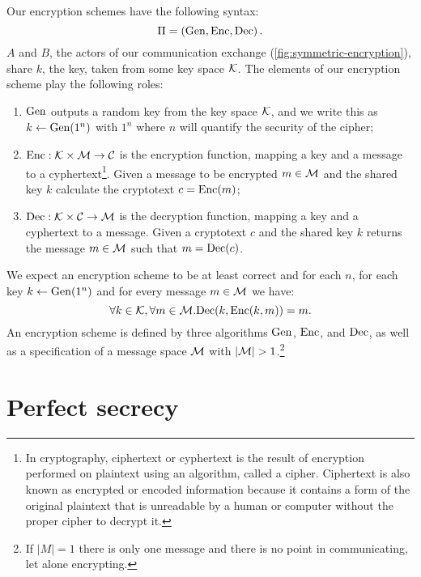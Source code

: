Our encryption schemes have the following syntax:
\begin{equation*}
	\Pi = \left( \mathrm{Gen}, \allowbreak \mathrm{Enc}, \allowbreak \mathrm{Dec} \right).
\end{equation*}
$A$ and $B$, the actors of our communication exchange (\cref{fig:symmetric-encryption}), share $k$, the key, taken from some key space $\mathcal{K}$.
The elements of our encryption scheme play the following roles:
\begin{enumerate}
	\item $\mathrm{Gen}$ outputs a random key from the key space $\mathcal{K}$, and we write this as $k \leftarrow \mathrm{Gen}(1^n)$ with $1^n$ where $n$ will quantify the security of the cipher;
	\item $\mathrm{Enc} : \mathcal{K} \times \mathcal{M} \to \mathcal{C}$ is the encryption function, mapping a key and a message to a cyphertext\footnote{In cryptography, ciphertext or cyphertext is the result of encryption performed on plaintext using an algorithm, called a cipher. Ciphertext is also known as encrypted or encoded information because it contains a form of the original plaintext that is unreadable by a human or computer without the proper cipher to decrypt it.}. Given a message to be encrypted $m \in \mathcal{M}$ and the shared key $k$ calculate the cryptotext $c = \mathrm{Enc}(m)$;
	\item $\mathrm{Dec} : \mathcal{K} \times \mathcal{C} \to \mathcal{M}$ is the decryption function, mapping a key and a cyphertext to a message. Given a cryptotext $c$ and the shared key $k$ returns the message $m \in \mathcal{M}$ such that $m = \mathrm{Dec}(c)$.
\end{enumerate}
We expect an encryption scheme to be at least correct and for each $n$, for each key $k \leftarrow \mathrm{Gen}(1^n)$ and for every message $m \in \mathcal{M}$ we have:
\begin{equation*}
	\forall k \in \mathcal{K}, \forall m \in \mathcal{M} . \mathrm{Dec}(k, \mathrm{Enc}(k, m)) = m.
\end{equation*}
An encryption scheme is defined by three algorithms $\mathrm{Gen}$, $\mathrm{Enc}$, and $\mathrm{Dec}$, as well as a specification of a message space $\mathcal{M}$ with $| \mathcal{M} | > 1$.\footnote{If $| M | = 1$ there is only one message and there is no point in communicating, let alone encrypting.}
\section{Perfect secrecy}

